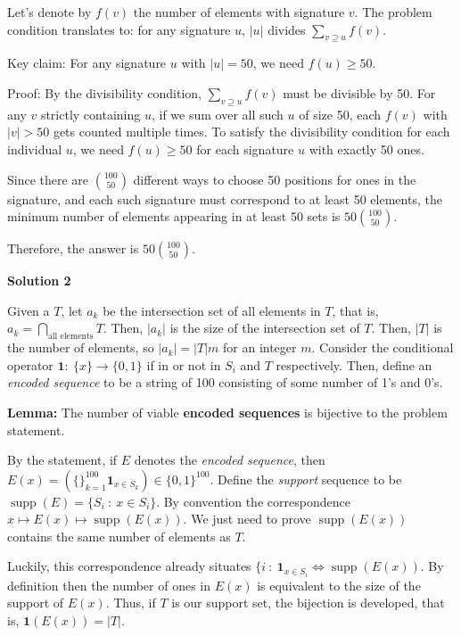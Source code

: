 \begin{enumerate}
 Let's denote by $f(v)$ the number of elements with signature $v$. The problem condition translates to: for any signature $u$, $|u|$ divides $\sum_{v \supseteq u} f(v)$.

 Key claim: For any signature $u$ with $|u| = 50$, we need $f(u) \geq 50$.

 Proof: By the divisibility condition, $\sum_{v \supseteq u} f(v)$ must be divisible by 50. For any $v$ strictly containing $u$, if we sum over all such $u$ of size 50, each $f(v)$ with $|v| > 50$ gets counted multiple times. To satisfy the divisibility condition for each individual $u$, we need $f(u) \geq 50$ for each signature $u$ with exactly 50 ones.

 Since there are $\binom{100}{50}$ different ways to choose 50 positions for ones in the signature, and each such signature must correspond to at least 50 elements, the minimum number of elements appearing in at least 50 sets is $50 \binom{100}{50}$.

 Therefore, the answer is $\boxed{50 \binom{100}{50}}$.

 



\textbf{Solution 2}

Given a $T$, let $a_k$ be the intersection set of all elements in $T$, that is, $a_k = \bigcap_{\text{all elements}} T$. Then, $|a_k|$ is the size of the intersection set of $T$. Then, $|T|$ is the number of elements, so $|a_k| = |T|m$ for an integer $m$. Consider the conditional operator $\mathbf{1}: \ \{x \} \rightarrow \{0,1 \}$ if in or not in $S_i$ and $T$ respectively. Then, define an \textit{encoded sequence} to be a string of 100 consisting of some number of 1's and 0's. 

 \textbf{Lemma:} The number of viable \textbf{encoded sequences} is bijective to the problem statement.

 By the statement, if $E$ denotes the \textit{encoded sequence}, then $E(x) = (\{\}_{k=1}^{100} \mathbf{1}_{x \in S_k}) \in \{0,1 \}^{100}$. Define the \textit{support} sequence to be $\operatorname{supp}(E) = \{S_i \ : \ x \in S_i \}$. By convention the correspondence $x \mapsto E(x) \mapsto \operatorname{supp}(E(x))$. We just need to prove $\operatorname{supp}(E(x))$ contains the same number of elements as $T$. 

 Luckily, this correspondence already situates $\{i \ : \ \mathbf{1}_{x \in S_i}  \iff \operatorname{supp}(E(x))$. By definition then the number of ones in $E(x)$ is equivalent to the size of the support of $E(x)$. Thus, if $T$ is our support set, the bijection is developed, that is, $\mathbf{1}(E(x)) = |T|$. 


\end{enumerate}
